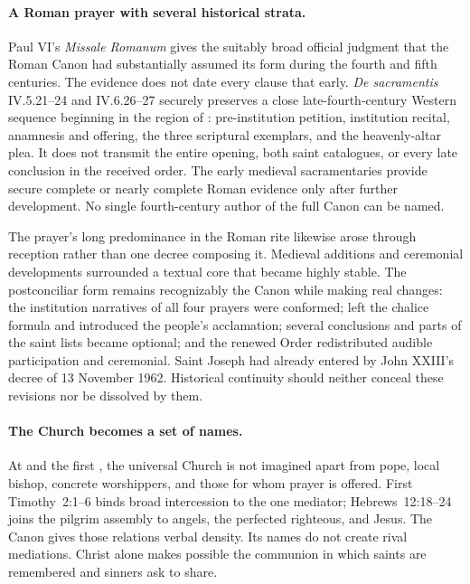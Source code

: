 \paragraph{A Roman prayer with several historical strata.}
Paul VI's \emph{Missale Romanum} gives the suitably broad official judgment that the Roman Canon had substantially assumed its form during the fourth and fifth centuries. The evidence does not date every clause that early. \emph{De sacramentis} IV.5.21--24 and IV.6.26--27 securely preserves a close late-fourth-century Western sequence beginning in the region of : pre-institution petition, institution recital, anamnesis and offering, the three scriptural exemplars, and the heavenly-altar plea. It does not transmit the entire opening, both saint catalogues, or every late conclusion in the received order. The early medieval sacramentaries provide secure complete or nearly complete Roman evidence only after further development. No single fourth-century author of the full Canon can be named.

The prayer's long predominance in the Roman rite likewise arose through reception rather than one decree composing it. Medieval additions and ceremonial developments surrounded a textual core that became highly stable. The postconciliar form remains recognizably the Canon while making real changes: the institution narratives of all four prayers were conformed;  left the chalice formula and introduced the people's acclamation; several conclusions and parts of the saint lists became optional; and the renewed Order redistributed audible participation and ceremonial. Saint Joseph had already entered  by John XXIII's decree of 13 November 1962. Historical continuity should neither conceal these revisions nor be dissolved by them.

\paragraph{The Church becomes a set of names.}
At  and the first , the universal Church is not imagined apart from pope, local bishop, concrete worshippers, and those for whom prayer is offered. First Timothy~2:1--6 binds broad intercession to the one mediator; Hebrews~12:18--24 joins the pilgrim assembly to angels, the perfected righteous, and Jesus. The Canon gives those relations verbal density. Its names do not create rival mediations. Christ alone makes possible the communion in which saints are remembered and sinners ask to share.

